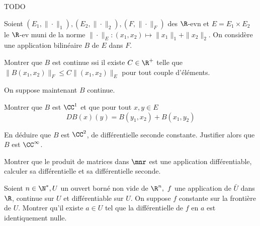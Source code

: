 \documentclass{report}
\begin{document}
\begin{exo}
    TODO
\end{exo}

\begin{exo}
    Soient \(\left(E_1,\|\cdot\|_1\right), \left(E_2,\|\cdot\|_2\right),
    \left(F,\|\cdot\|_F\right)\) des \(\R\)-evn et \(E=E_1\times E_2\) le
    \(\R\)-ev muni de la norme \(\|\cdot\|_E\colon(x_1,x_2)\mapsto\|x_1\|_1+
    \|x_2\|_2\). On considère une application bilinéaire \(B\) de \(E\) dans \(F\).
    \begin{q}{1}
        Montrer que \(B\) est continue ssi il existe \(C\in\R^+\) telle que
        \(\|B(x_1,x_2)\|_F\leq C\|(x_1,x_2)\|_E\) pour tout couple d'éléments.
    \end{q}
    On suppose maintenant \(B\) continue.
    \begin{q}{2}
        Montrer que \(B\) est \(\CC^1\) et que pour tout \(x,y\in E\)
        \[DB(x)(y)=B(y_1,x_2)+B(x_1,y_2)\]
    \end{q}
    \begin{q}{3}
        En déduire que \(B\) est \(\CC^2\), de différentielle seconde
        constante. Justifier alors que \(B\) est \(\CC^\infty\).
    \end{q}
    \begin{q}{4}
        Montrer que le produit de matrices dans \(\mnr\) est une application
        différentiable, calculer sa différentielle et sa différentielle seconde.
    \end{q}
\end{exo}

\begin{exo}
    Soient \(n\in\N^*, U\) un ouvert borné non vide de \(\R^n,\ f\) une application
    de \(\bar{U}\) dans \(\R\), continue sur \(U\) et différentiable sur \(U\).
    On suppose \(f\) constante sur la frontière de \(U\). Montrer qu'il existe \(a\in U\)
    tel que la différentielle de \(f\) en \(a\) est identiquement nulle.
\end{exo}
\end{document}
